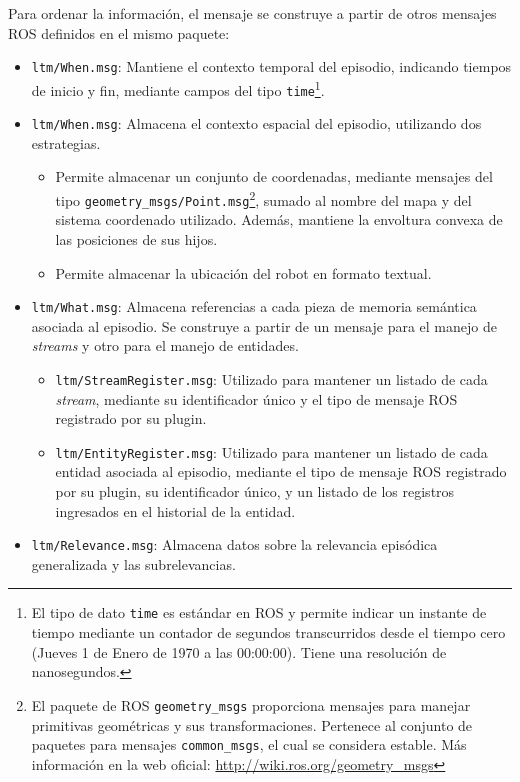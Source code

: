 Para ordenar la información, el mensaje se construye a partir de otros mensajes ROS definidos en el mismo paquete:
\begin{itemize}
\item \texttt{ltm/When.msg}: Mantiene el contexto temporal del episodio, indicando tiempos de inicio y fin, mediante campos del tipo \texttt{time}\footnote{El tipo de dato \texttt{time} es estándar en ROS y permite indicar un instante de tiempo mediante un contador de segundos transcurridos desde el tiempo cero (Jueves 1 de Enero de 1970 a las 00:00:00). Tiene una resolución de nanosegundos.}.
\item \texttt{ltm/When.msg}: Almacena el contexto espacial del episodio, utilizando dos estrategias.
\begin{itemize}
\item  Permite almacenar un conjunto de coordenadas, mediante mensajes del tipo \texttt{geometry\_msgs/Point.msg}\footnote{El paquete de ROS \texttt{geometry\_msgs} proporciona mensajes para manejar primitivas geométricas y sus transformaciones. Pertenece al conjunto de paquetes para mensajes \texttt{common\_msgs}, el cual se considera estable. Más información en la web oficial: \url{http://wiki.ros.org/geometry\_msgs}}, sumado al nombre del mapa y del sistema coordenado utilizado. Además, mantiene la envoltura convexa de las posiciones de sus hijos.
\item Permite almacenar la ubicación del robot en formato textual.
\end{itemize}
\item \texttt{ltm/What.msg}: Almacena referencias a cada pieza de memoria semántica asociada al episodio. Se construye a partir de un mensaje para el manejo de \textit{streams} y otro para el manejo de entidades.
\begin{itemize}
\item \texttt{ltm/StreamRegister.msg}: Utilizado para mantener un listado de cada \textit{stream}, mediante su identificador único y el tipo de mensaje ROS registrado por su plugin.
\item \texttt{ltm/EntityRegister.msg}: Utilizado para mantener un listado de cada entidad asociada al episodio, mediante el tipo de mensaje ROS registrado por su plugin, su identificador único, y un listado de los registros ingresados en el historial de la entidad.
\end{itemize}
\item \texttt{ltm/Relevance.msg}: Almacena datos sobre la relevancia episódica generalizada y las subrelevancias.

\end{itemize}
